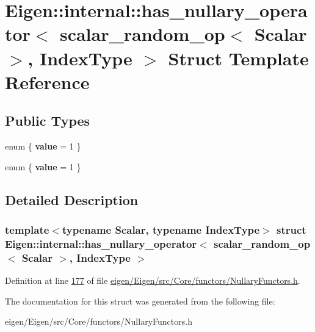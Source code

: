 \hypertarget{struct_eigen_1_1internal_1_1has__nullary__operator_3_01scalar__random__op_3_01_scalar_01_4_00_01_index_type_01_4}{}\section{Eigen\+:\+:internal\+:\+:has\+\_\+nullary\+\_\+operator$<$ scalar\+\_\+random\+\_\+op$<$ Scalar $>$, Index\+Type $>$ Struct Template Reference}
\label{struct_eigen_1_1internal_1_1has__nullary__operator_3_01scalar__random__op_3_01_scalar_01_4_00_01_index_type_01_4}
\subsection*{Public Types}
\begin{DoxyCompactItemize}
\item 
\mbox{\label{struct_eigen_1_1internal_1_1has__nullary__operator_3_01scalar__random__op_3_01_scalar_01_4_00_01_index_type_01_4_a287c2f9867f224bf4018ee65ea7f981f}} 
enum \{ {\bfseries value} = 1
 \}
\item 
\mbox{\label{struct_eigen_1_1internal_1_1has__nullary__operator_3_01scalar__random__op_3_01_scalar_01_4_00_01_index_type_01_4_aa2d71199146fc276a55d695ff5c0ac8c}} 
enum \{ {\bfseries value} = 1
 \}
\end{DoxyCompactItemize}


\subsection{Detailed Description}
\subsubsection*{template$<$typename Scalar, typename Index\+Type$>$\newline
struct Eigen\+::internal\+::has\+\_\+nullary\+\_\+operator$<$ scalar\+\_\+random\+\_\+op$<$ Scalar $>$, Index\+Type $>$}



Definition at line \hyperlink{eigen_2_eigen_2src_2_core_2functors_2_nullary_functors_8h_source_l00177}{177} of file \hyperlink{eigen_2_eigen_2src_2_core_2functors_2_nullary_functors_8h_source}{eigen/\+Eigen/src/\+Core/functors/\+Nullary\+Functors.\+h}.



The documentation for this struct was generated from the following file\+:\begin{DoxyCompactItemize}
\item 
eigen/\+Eigen/src/\+Core/functors/\+Nullary\+Functors.\+h\end{DoxyCompactItemize}
